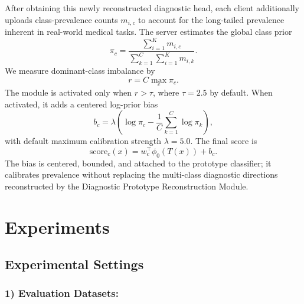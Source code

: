 \documentclass[letterpaper]{article} %
\begin{document}
After obtaining this newly reconstructed diagnostic head, each client additionally uploads class-prevalence counts $m_{i,c}$ to account for the long-tailed prevalence inherent in real-world medical tasks. The server estimates the global class prior
\begin{equation}
\pi_c=\frac{\sum_{i=1}^{K}m_{i,c}}{\sum_{k=1}^{C}\sum_{i=1}^{K}m_{i,k}}.
\end{equation}
We measure dominant-class imbalance by
\begin{equation}
r=C\max_c \pi_c.
\end{equation}
The module is activated only when $r>\tau$, where $\tau=2.5$ by default. When activated, it adds a centered log-prior bias
\begin{equation}
b_c=\lambda\left(\log\pi_c-\frac{1}{C}\sum_{k=1}^{C}\log\pi_k\right),
\end{equation}
with default maximum calibration strength $\lambda=5.0$. The final score is
\begin{equation}
\mathrm{score}_c(x)=w_c^\top\phi_0(T(x))+b_c.
\end{equation}
The bias is centered, bounded, and attached to the prototype classifier; it calibrates prevalence without replacing the multi-class diagnostic directions reconstructed by the Diagnostic Prototype Reconstruction Module.

\section{Experiments}

\subsection{Experimental Settings}

\subsubsection{1) Evaluation Datasets:}
\end{document}
